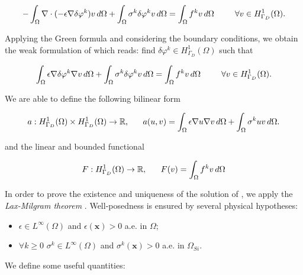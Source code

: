 \begin{equation}
\label{eq: integration first}
- \int_{\Omega}  \nabla \cdot ( -\epsilon \nabla \delta\varphi^k)  v \, d\Omega + \int_{\Omega} \sigma^{k}\delta \varphi^k v \, d\Omega = \int_{\Omega} f^{k}v \, d\Omega \psp{15} \forall v \in H^1_{\Gamma_D}(\Omega).
\end{equation}

Applying the Green formula and considering the boundary conditions, we obtain the weak formulation of  which reads: find $\delta \varphi^k \in H^1_{\Gamma_D}(\Omega)$ such that

\begin{equation}
\label{eq: NLP weakformulation}
\int_{\Omega} \epsilon \nabla \delta\varphi^k \nabla v \, d\Omega + \int_{\Omega} \sigma^{k}\delta \varphi^k v \, d\Omega = \int_{\Omega} f^{k}v \, d\Omega \psp{15} \forall v \in H^1_{\Gamma_D}(\Omega).
\end{equation}

We are able to define the following bilinear form

\begin{equation}
\label{eq: bilinear form NLP linearized}
a : H^1_{\Gamma_D}(\Omega) \times H^1_{\Gamma_D}(\Omega) \rightarrow \mathbb{R}, \psp{10} a(u,v) =  \int_{\Omega} \epsilon \nabla u \nabla v \, d\Omega + \int_{\Omega} \sigma^{k}u v \, d\Omega.
\end{equation}

and the linear and bounded functional

\begin{equation}
\label{eq: functional NLP linearized}
F:H^1_{\Gamma_D}(\Omega)\rightarrow \mathbb{R}, \psp{10} F(v) = \int_{\Omega} f^{k}v \, d\Omega
\end{equation}

In order to prove the existence and uniqueness of the solution of , we apply the \textit{Lax-Milgram theorem} \cite{salsa:EDP}.
Well-posedness is ensured by several physical hypotheses:

\begin{itemize}
\item $\epsilon \in L^{\infty}(\Omega)$ and $\epsilon(\mathbf{x})>0$ a.e. in $\Omega$;
\item  $\forall k \geq 0$ $\sigma^k \in L^{\infty}(\Omega)$ and $\sigma^k(\mathbf{x})>0$ a.e. in $\Omega_{Si}$.
\end{itemize}

We define some useful quantities:

